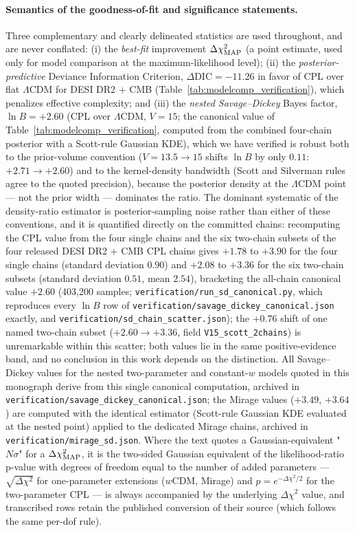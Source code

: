 \documentclass[11pt,letterpaper]{article}
\begin{document}
\paragraph{Semantics of the goodness-of-fit and significance statements.} Three complementary and clearly delineated statistics are used throughout, and are never conflated: (i) the \emph{best-fit} improvement $\Delta\chi^2_{\rm MAP}$ (a point estimate, used only for model comparison at the maximum-likelihood level); (ii) the \emph{posterior-predictive} Deviance Information Criterion, $\Delta\mathrm{DIC} = -11.26$ in favor of CPL over flat $\Lambda$CDM for DESI DR2 + CMB (Table~\ref{tab:modelcomp_verification}), which penalizes effective complexity; and (iii) the \emph{nested Savage--Dickey} Bayes factor, $\ln B = +2.60$ (CPL over $\Lambda$CDM, $V = 15$; the canonical value of Table~\ref{tab:modelcomp_verification}, computed from the combined four-chain posterior with a Scott-rule Gaussian KDE), which we have verified is robust both to the prior-volume convention ($V = 13.5 \to 15$ shifts $\ln B$ by only $0.11$: $+2.71 \to +2.60$) and to the kernel-density bandwidth (Scott and Silverman rules agree to the quoted precision), because the posterior density at the $\Lambda$CDM point --- not the prior width --- dominates the ratio. The dominant systematic of the density-ratio estimator is posterior-sampling noise rather than either of these conventions, and it is quantified directly on the committed chains: recomputing the CPL value from the four single chains and the six two-chain subsets of the four released DESI DR2 + CMB CPL chains gives $+1.78$ to $+3.90$ for the four single chains (standard deviation $0.90$) and $+2.08$ to $+3.36$ for the six two-chain subsets (standard deviation $0.51$, mean $2.54$), bracketing the all-chain canonical value $+2.60$ (403{,}200 samples; \texttt{verification/run\_sd\_canonical.py}, which reproduces every $\ln B$ row of \texttt{verification/savage\_dickey\_canonical.json} exactly, and \texttt{verification/sd\_chain\_scatter.json}); the $+0.76$ shift of one named two-chain subset ($+2.60 \to +3.36$, field \texttt{V15\_scott\_2chains}) is unremarkable within this scatter; both values lie in the same positive-evidence band, and no conclusion in this work depends on the distinction. All Savage--Dickey values for the nested two-parameter and constant-$w$ models quoted in this monograph derive from this single canonical computation, archived in \texttt{verification/savage\_dickey\_canonical.json}; the Mirage values ($+3.49$, $+3.64$) are computed with the identical estimator (Scott-rule Gaussian KDE evaluated at the nested point) applied to the dedicated Mirage chains, archived in \texttt{verification/mirage\_sd.json}. Where the text quotes a Gaussian-equivalent "$N\sigma$" for a $\Delta\chi^2_{\rm MAP}$, it is the two-sided Gaussian equivalent of the likelihood-ratio p-value with degrees of freedom equal to the number of added parameters --- $\sqrt{\Delta\chi^2}$ for one-parameter extensions ($w$CDM, Mirage) and $p = e^{-\Delta\chi^2/2}$ for the two-parameter CPL --- is always accompanied by the underlying $\Delta\chi^2$ value, and transcribed rows retain the published conversion of their source (which follows the same per-dof rule).
\end{document}
